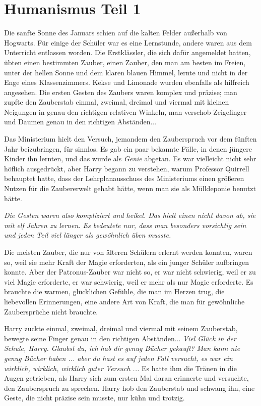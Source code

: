 \chapter{Humanismus Teil 1}

Die sanfte Sonne des Januars schien auf die kalten Felder außerhalb von
Hogwarts. Für einige der Schüler war es eine Lernstunde, andere waren aus dem
Unterricht entlassen worden. Die Erstklässler, die sich dafür angemeldet hatten,
übten einen bestimmten Zauber, einen Zauber, den man am besten im Freien, unter
der hellen Sonne und dem klaren blauen Himmel, lernte und nicht in der Enge
eines Klassenzimmers. Kekse und Limonade wurden ebenfalls als hilfreich
angesehen. Die ersten Gesten des Zaubers waren komplex und präzise; man zupfte
den Zauberstab einmal, zweimal, dreimal und viermal mit kleinen Neigungen in
genau den richtigen relativen Winkeln, man verschob Zeigefinger und Daumen genau
in den richtigen Abständen...

Das Ministerium hielt den Versuch, jemandem den Zauberspruch vor dem fünften
Jahr beizubringen, für sinnlos. Es gab ein paar bekannte Fälle, in denen jüngere
Kinder ihn lernten, und das wurde als \glqq{}\emph{Genie}\grqq{} abgetan. Es war
vielleicht nicht sehr höflich ausgedrückt, aber Harry begann zu verstehen, warum
Professor Quirrell behauptet hatte, dass der Lehrplanausschuss des Ministeriums
einen größeren Nutzen für die Zaubererwelt gehabt hätte, wenn man sie als
Mülldeponie benutzt hätte.

\emph{Die Gesten waren also kompliziert und heikel. Das hielt einen nicht davon
ab, sie mit elf Jahren zu lernen. Es bedeutete nur, dass man besonders
vorsichtig sein und jeden Teil viel länger als gewöhnlich üben musste.}

Die meisten Zauber, die nur von älteren Schülern erlernt werden konnten, waren
so, weil sie mehr Kraft der Magie erforderten, als ein junger Schüler aufbringen
konnte. Aber der Patronus-Zauber war nicht so, er war nicht schwierig, weil er
zu viel Magie erforderte, er war schwierig, weil er mehr als nur Magie
erforderte. Es brauchte die warmen, glücklichen Gefühle, die man im Herzen trug,
die liebevollen Erinnerungen, eine andere Art von Kraft, die man für gewöhnliche
Zaubersprüche nicht brauchte.

Harry zuckte einmal, zweimal, dreimal und viermal mit seinem Zauberstab, bewegte
seine Finger genau in den richtigen Abständen... \glqq{}\emph{Viel Glück in der
Schule, Harry. Glaubst du, ich hab dir genug Bücher gekauft?}\grqq{} \glqq{}
\emph{Man kann nie genug Bücher haben ... aber du hast es auf jeden Fall
versucht, es war ein wirklich, wirklich, wirklich guter Versuch ...\grqq{}} Es
hatte ihm die Tränen in die Augen getrieben, als Harry sich zum ersten Mal daran
erinnerte und versuchte, den Zauberspruch zu sprechen. Harry hob den Zauberstab
und schwang ihn, eine Geste, die nicht präzise sein musste, nur kühn und
trotzig.

